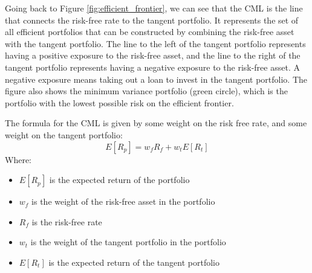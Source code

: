Going back to Figure \ref{fig:efficient_frontier}, we can see that the CML is the line that connects the risk-free rate to the tangent portfolio.
It represents the set of all efficient portfolios that can be constructed by combining the risk-free asset with the tangent portfolio.
The line to the left of the tangent portfolio represents having a positive exposure to the risk-free asset, and the line to the right of the tangent portfolio represents having a negative exposure to the risk-free asset.
A negative exposure means taking out a loan to invest in the tangent portfolio. The figure also shows the minimum variance portfolio (green circle), which is the portfolio with the lowest possible risk on the efficient frontier.

The formula for the CML is given by some weight on the risk free rate, and some weight on the tangent portfolio:
\begin{equation}
    \label{eq:cml}
    E[R_p] = w_f R_f + w_t E[R_t]
\end{equation}
Where:
\begin{itemize}
    \item $E[R_p]$ is the expected return of the portfolio
    \item $w_f$ is the weight of the risk-free asset in the portfolio
    \item $R_f$ is the risk-free rate
    \item $w_t$ is the weight of the tangent portfolio in the portfolio
    \item $E[R_t]$ is the expected return of the tangent portfolio
\end{itemize}